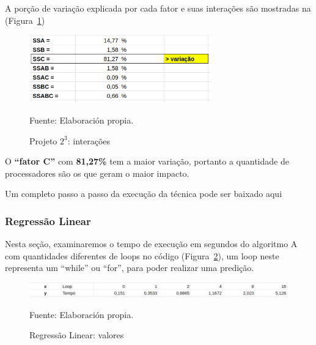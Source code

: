 \documentclass[12pt]{article}
\begin{document}
A porção de variação explicada por cada fator e suas interações são mostradas na (Figura~\ref{figure:projeto_2_interacoes})

\begin{figure}[!ht]
	\begin{center}
		\includegraphics[width=0.7\textwidth]{images/projeto_2_interacoes}
	\end{center}
	\begin{center}
		\caption{\label{figure:projeto_2_interacoes}
			\small{Projeto ${2^3}$: interações}}
		{\small{Fuente: Elaboración propia.}}
	\end{center}
\end{figure}
	
O \textbf{``fator C''} com \textbf{81,27\%} tem a maior variação, portanto a quantidade de processadores são os que geram o maior impacto. 

Um completo passo a passo da execução da técnica pode ser baixado aqui 

\subsubsection{Regressão Linear}

Nesta seção, examinaremos o tempo de execução em segundos do algoritmo A com quantidades diferentes de loops no código (Figura~\ref{figure:regressao_valores}), um loop neste representa um ``while'' ou ``for'', para poder realizar uma predição.

\begin{figure}[!ht]
	\begin{center}
		\includegraphics[width=1\textwidth]{images/regressao_valores}
	\end{center}
	\begin{center}
		\caption{\label{figure:regressao_valores}
			\small{Regressão Linear: valores}}
		{\small{Fuente: Elaboración propia.}}
	\end{center}
\end{figure}
\end{document}
